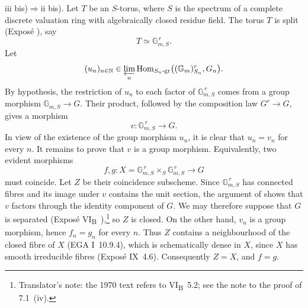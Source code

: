 \textup{iii bis)}\(\Rightarrow\)\textup{ii bis)}.
Let \(T\) be an \(S\)-torus, where \(S\) is the spectrum of a complete
discrete valuation ring with algebraically closed residue field. The
torus \(T\) is split (Exposé ), say
\[
  T\simeq\mathbb G_{m,S}^{\,r}.
\]
Let
\[
 (u_n)_{n\in\mathbb N}\in
 \varprojlim_n
 \operatorname{Hom}_{S_n\text{-gr}}
 \bigl((\mathbb G_m)^r_{S_n},G_n\bigr).
\]
By hypothesis, the restriction of \(u_n\) to each factor of
\(\mathbb G_{m,S}^{\,r}\) comes from a group morphism
\(\mathbb G_{m,S}\to G\). Their product, followed by the composition
law \(G^r\to G\), gives a morphism
\[
  v:\mathbb G_{m,S}^{\,r}\longrightarrow G.
\]
In view of the existence of the group morphism \(u_n\), it is clear that
\(u_n=v_n\) for every \(n\). It remains to prove that \(v\)
is a group morphism. Equivalently, two evident morphisms
\[
 f,g:X=\mathbb G_{m,S}^{\,r}\times_S\mathbb G_{m,S}^{\,r}
 \longrightarrow G
\]
must coincide. Let \(Z\) be their coincidence subscheme. Since
\(\mathbb G_{m,S}^{\,r}\) has connected fibres and its image under
\(v\) contains the unit section, the argument of  shows
that \(v\) factors through the identity component of \(G\). We may
therefore suppose that \(G\) is separated
(Exposé VI\textsubscript{B}~),\footnote{Translator's note: the 1970 text
refers to VI\textsubscript{B}~5.2; see the note to the proof of 7.1~(iv).} so \(Z\) is closed. On the other
hand, \(v_n\) is a group morphism, hence \(f_n=g_n\) for every \(n\).
Thus \(Z\) contains a neighbourhood of the closed fibre of \(X\)
(EGA I~10.9.4), which is schematically dense in \(X\), since \(X\)
has smooth irreducible fibres (Exposé IX~4.6). Consequently
\(Z=X\), and \(f=g\).

